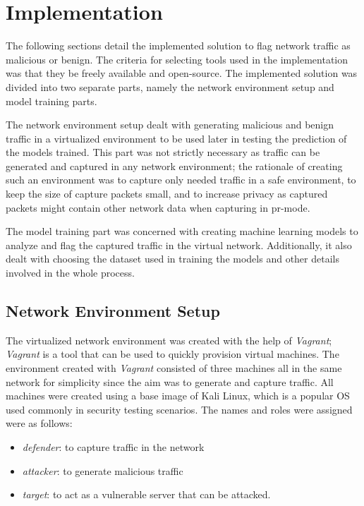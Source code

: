 \clearpage%
\vspace{21.5pt}
\chapter{Implementation}\label{ch:proposed-solution}

The following sections detail the implemented solution to flag network traffic as malicious or benign.
The criteria for selecting tools used in the implementation was that they be freely available and open-source.
The implemented solution was divided into two separate parts, namely the network environment setup and model training parts.

The network environment setup dealt with generating malicious and benign traffic in a virtualized environment to be used later in testing the prediction of the models trained.
This part was not strictly necessary as traffic can be generated and captured in any network environment;
the rationale of creating such an environment was to capture only needed traffic in a safe environment, to keep the size of
capture packets small, and to increase privacy as captured packets might contain other network data when capturing in \gls{pr-mode}.

The model training part was concerned with creating machine learning models to analyze and flag the captured traffic in the virtual network.
Additionally, it also dealt with choosing the dataset used in training the models and other details involved in the whole process.


\section{Network Environment Setup}\label{sec:environment-setup}
The virtualized network environment was created with the help of \emph{Vagrant};
\emph{Vagrant} is a tool that can be used to quickly provision virtual machines.
The environment created with \emph{Vagrant} consisted of three machines all in the same network for simplicity since the aim was to generate and capture traffic.
All machines were created using a base image of Kali Linux, which is a popular OS used commonly in security testing scenarios.
The names and roles were assigned were as follows:

\begin{itemize}
    \item \emph{defender}: to capture traffic in the network
    \item \emph{attacker}: to generate malicious traffic
    \item \emph{target}: to act as a vulnerable server that can be attacked.
\end{itemize}

